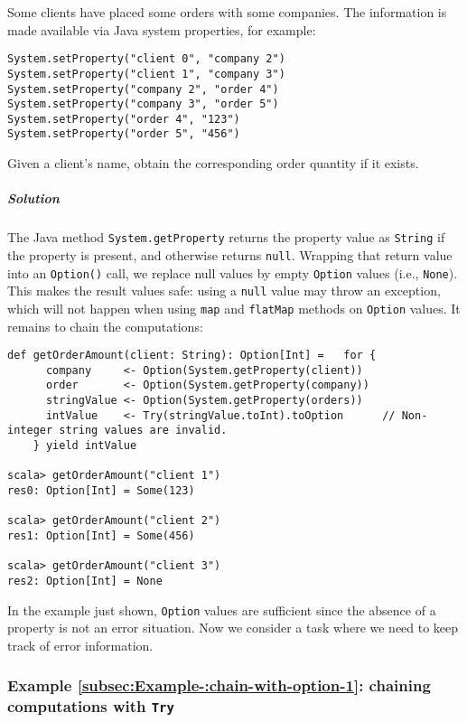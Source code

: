 Some clients have placed some orders with some companies. The information
is made available via Java system properties, for example:
\begin{lstlisting}
System.setProperty("client 0", "company 2")
System.setProperty("client 1", "company 3")
System.setProperty("company 2", "order 4")
System.setProperty("company 3", "order 5")
System.setProperty("order 4", "123")
System.setProperty("order 5", "456")
\end{lstlisting}
Given a client\textsf{'}s name, obtain the corresponding order quantity if
it exists.

\subparagraph{Solution}

The Java method \lstinline!System.getProperty! returns the property
value as \lstinline!String! if the property is present, and otherwise
returns \lstinline!null!. Wrapping that return value into an \lstinline!Option()!
call, we replace null values by empty \lstinline!Option! values (i.e.,
\lstinline!None!). This makes the result values safe: using a \lstinline!null!
value may throw an exception, which will not happen when using \lstinline!map!
and \lstinline!flatMap! methods on \lstinline!Option! values. It
remains to chain the computations:

\begin{lstlisting}
def getOrderAmount(client: String): Option[Int] =   for {
      company     <- Option(System.getProperty(client))
      order       <- Option(System.getProperty(company))
      stringValue <- Option(System.getProperty(orders))
      intValue    <- Try(stringValue.toInt).toOption      // Non-integer string values are invalid.
    } yield intValue

scala> getOrderAmount("client 1")
res0: Option[Int] = Some(123)

scala> getOrderAmount("client 2")
res1: Option[Int] = Some(456)

scala> getOrderAmount("client 3")
res2: Option[Int] = None
\end{lstlisting}

In the example just shown, \lstinline!Option! values are sufficient
since the absence of a property is not an error situation. Now we
consider a task where we need to keep track of error information.

\subsubsection{Example \label{subsec:Example-:chain-with-option-1}\ref{subsec:Example-:chain-with-option-1}:
chaining computations with \texttt{Try}}


